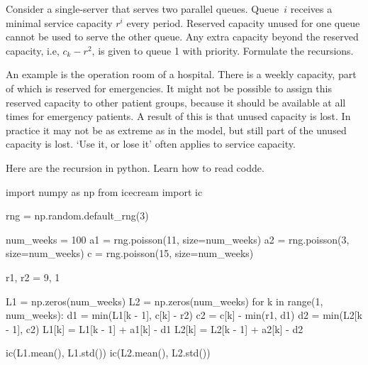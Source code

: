 \documentclass[queueing-book.tex]{subfiles}
\begin{document}
\begin{exercise}\label{ex:l-118}
 Consider  a single-server that serves two parallel queues.
 Queue~$i$ receives a minimal service capacity $r^i$ every period.
 Reserved capacity unused for one queue cannot be used to serve the other queue.
 Any extra capacity beyond the reserved capacity, i.e, $c_k - r^2$,  is given to queue 1 with priority.
 Formulate the recursions.

An example is  the operation room of a hospital.
There is a weekly capacity, part of which is reserved for emergencies.
It might not be possible to assign this reserved capacity to other patient groups, because it should be available at all times for emergency patients.
A result of this is that unused capacity is lost.
In practice it may not be as extreme as in the model, but still part
of the unused capacity is lost. `Use it, or lose it' often applies to service capacity.
\begin{solution}
Here are the recursion in python. Learn how to read codde.
\begin{python}
import numpy as np
from icecream import ic

rng = np.random.default_rng(3)

num_weeks = 100
a1 = rng.poisson(11, size=num_weeks)
a2 = rng.poisson(3, size=num_weeks)
c = rng.poisson(15, size=num_weeks)

r1, r2 = 9, 1

L1 = np.zeros(num_weeks)
L2 = np.zeros(num_weeks)
for k in range(1, num_weeks):
    d1 = min(L1[k - 1], c[k] - r2)
    c2 = c[k] - min(r1, d1)
    d2 = min(L2[k - 1], c2)
    L1[k] = L1[k - 1] + a1[k] - d1
    L2[k] = L2[k - 1] + a2[k] - d2


ic(L1.mean(), L1.std())
ic(L2.mean(), L2.std())
\end{python}

\end{solution}
\end{exercise}
\end{document}
